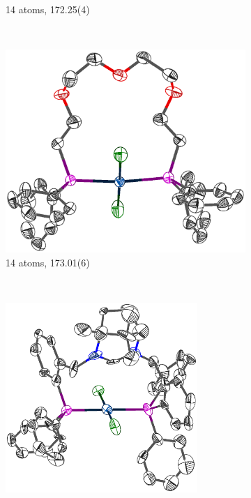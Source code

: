 \begin{figure}[htbp]
\begin{subfigure}[b]{0.3\textwidth}
                \caption{14 atoms, 172.25(4)\degrees}
                \label{NURGAI}
        \end{subfigure}
       \\
        \begin{subfigure}[b]{0.4\textwidth}
                \includegraphics[width=\textwidth]{../Othercrystals/PtCl2/Trans/661699.eps}
                \caption{14 atoms, 173.01(6)\degrees}
                \label{HOJDUG}
        \end{subfigure}%
        ~
        \begin{subfigure}[b]{0.4\textwidth}
                \includegraphics[width=0.8\textwidth]{../Othercrystals/PtCl2/Trans/891177.eps}

\end{subfigure}
\end{figure}
